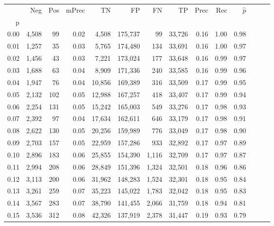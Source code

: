 \begin{tabular}{rrrrrrrrrrrrrr}
\toprule
{} &    Neg &  Pos & mPrec &       TN &       FP &      FN &      TP &  Prec &   Rec & $\hat{p}$ \\
p    &        &      &       &          &          &         &         &       &       &           \\
\midrule
0.00 &  4,508 &   99 &  0.02 &    4,508 &  175,737 &      99 &  33,726 &  0.16 &  1.00 &      0.98 \\
0.01 &  1,257 &   35 &  0.03 &    5,765 &  174,480 &     134 &  33,691 &  0.16 &  1.00 &      0.97 \\
0.02 &  1,456 &   43 &  0.03 &    7,221 &  173,024 &     177 &  33,648 &  0.16 &  0.99 &      0.97 \\
0.03 &  1,688 &   63 &  0.04 &    8,909 &  171,336 &     240 &  33,585 &  0.16 &  0.99 &      0.96 \\
0.04 &  1,947 &   76 &  0.04 &   10,856 &  169,389 &     316 &  33,509 &  0.17 &  0.99 &      0.95 \\
0.05 &  2,132 &  102 &  0.05 &   12,988 &  167,257 &     418 &  33,407 &  0.17 &  0.99 &      0.94 \\
0.06 &  2,254 &  131 &  0.05 &   15,242 &  165,003 &     549 &  33,276 &  0.17 &  0.98 &      0.93 \\
0.07 &  2,392 &   97 &  0.04 &   17,634 &  162,611 &     646 &  33,179 &  0.17 &  0.98 &      0.91 \\
0.08 &  2,622 &  130 &  0.05 &   20,256 &  159,989 &     776 &  33,049 &  0.17 &  0.98 &      0.90 \\
0.09 &  2,703 &  157 &  0.05 &   22,959 &  157,286 &     933 &  32,892 &  0.17 &  0.97 &      0.89 \\
0.10 &  2,896 &  183 &  0.06 &   25,855 &  154,390 &   1,116 &  32,709 &  0.17 &  0.97 &      0.87 \\
0.11 &  2,994 &  208 &  0.06 &   28,849 &  151,396 &   1,324 &  32,501 &  0.18 &  0.96 &      0.86 \\
0.12 &  3,113 &  200 &  0.06 &   31,962 &  148,283 &   1,524 &  32,301 &  0.18 &  0.95 &      0.84 \\
0.13 &  3,261 &  259 &  0.07 &   35,223 &  145,022 &   1,783 &  32,042 &  0.18 &  0.95 &      0.83 \\
0.14 &  3,567 &  283 &  0.07 &   38,790 &  141,455 &   2,066 &  31,759 &  0.18 &  0.94 &      0.81 \\
0.15 &  3,536 &  312 &  0.08 &   42,326 &  137,919 &   2,378 &  31,447 &  0.19 &  0.93 &      0.79 \\

\end{tabular}
